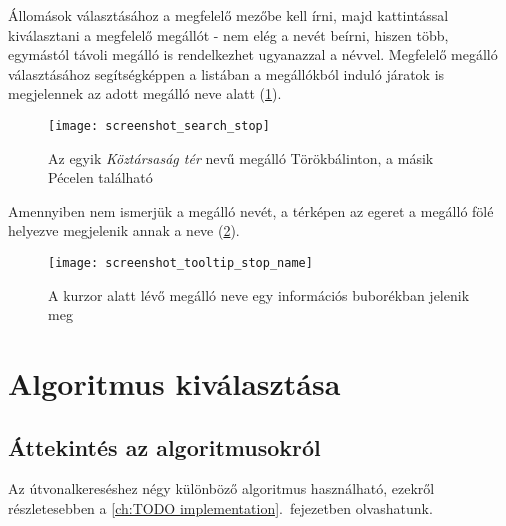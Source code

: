 Állomások választásához a megfelelő mezőbe kell írni, majd kattintással kiválasztani a megfelelő megállót - nem elég a nevét beírni, hiszen több, egymástól távoli megálló is rendelkezhet ugyanazzal a névvel. Megfelelő megálló választásához segítségképpen a listában a megállókból induló járatok is megjelennek az adott megálló neve alatt (\ref{fig:screenshot-search-stop}).

\begin{figure}[H]
	\centering
	\texttt{[image: screenshot\_search\_stop]}
	\caption{Az egyik \emph{Köztársaság tér} nevű megálló Törökbálinton, a másik Pécelen található}
	\label{fig:screenshot-search-stop}
\end{figure}

Amennyiben nem ismerjük a megálló nevét, a térképen az egeret a megálló fölé helyezve megjelenik annak a neve (\ref{fig:screenshot-tooltip-stop-name}).

\begin{figure}[H]
	\centering
	\texttt{[image: screenshot\_tooltip\_stop\_name]}
	\caption{A kurzor alatt lévő megálló neve egy információs buborékban jelenik meg}
	\label{fig:screenshot-tooltip-stop-name}
\end{figure}

\section{Algoritmus kiválasztása}

\subsection{Áttekintés az algoritmusokról}

Az útvonalkereséshez négy különböző algoritmus használható, ezekről részletesebben a \ref{ch:TODO implementation}.~fejezetben olvashatunk.

